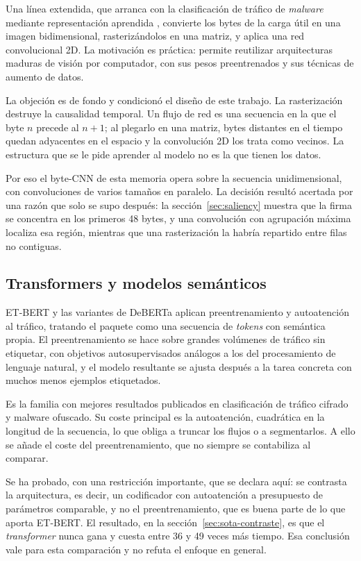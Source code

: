 Una línea extendida, que arranca con la clasificación de tráfico de \emph{malware}
mediante representación aprendida \cite{Wang2017}, convierte los bytes de la carga
útil en una imagen bidimensional, rasterizándolos en una matriz, y aplica una red
convolucional 2D. La motivación es práctica: permite reutilizar arquitecturas
maduras de visión por computador, con sus pesos preentrenados y sus técnicas de
aumento de datos.

La objeción es de fondo y condicionó el diseño de este trabajo. La rasterización
destruye la causalidad temporal. Un flujo de red es una secuencia en la que el
byte $n$ precede al $n+1$; al plegarlo en una matriz, bytes distantes en el
tiempo quedan adyacentes en el espacio y la convolución 2D los trata como
vecinos. La estructura que se le pide aprender al modelo no es la que tienen los
datos.

Por eso el byte-CNN de esta memoria opera sobre la secuencia unidimensional, con
convoluciones de varios tamaños en paralelo. La decisión resultó acertada por una
razón que solo se supo después: la sección~\ref{sec:saliency} muestra que la
firma se concentra en los primeros 48 bytes, y una convolución con agrupación
máxima localiza esa región, mientras que una rasterización la habría repartido
entre filas no contiguas.

\subsection{Transformers y modelos semánticos}

ET-BERT \cite{ETBERT} y las variantes de DeBERTa aplican preentrenamiento y
autoatención al tráfico, tratando el paquete como una secuencia de \emph{tokens}
con semántica propia. El preentrenamiento se hace sobre grandes volúmenes de
tráfico sin etiquetar, con objetivos autosupervisados análogos a los del
procesamiento de lenguaje natural, y el modelo resultante se ajusta después a la
tarea concreta con muchos menos ejemplos etiquetados.

Es la familia con mejores resultados publicados en clasificación de tráfico
cifrado y malware ofuscado. Su coste principal es la autoatención, cuadrática en
la longitud de la secuencia, lo que obliga a truncar los flujos o a segmentarlos.
A ello se añade el coste del preentrenamiento, que no siempre se contabiliza al
comparar.

Se ha probado, con una restricción importante, que se declara aquí: se contrasta
la arquitectura, es decir, un codificador con autoatención a presupuesto de
parámetros comparable, y no el preentrenamiento, que es buena parte de lo que
aporta ET-BERT. El resultado, en la sección~\ref{sec:sota-contraste}, es que el
\emph{transformer} nunca gana y cuesta entre 36 y 49 veces más tiempo. Esa
conclusión vale para esta comparación y no refuta el enfoque en general.

